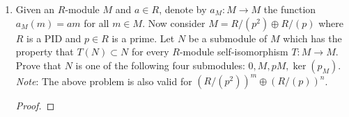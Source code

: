 \documentclass[../psets.tex]{subfiles}
\begin{document}
\begin{enumerate}
\begin{enumerate}
\begin{equation*}
            (1,0),(X,0),\dots,(X^{e-1},0),(0,1),(0,X),\dots,(0,X^{d-1})
        \end{equation*}
        is the basis for $F[X]_{<e}\oplus F[X]_{<d}$ and
        \begin{equation*}
            1,X,\dots,X^{d+e-1}
        \end{equation*}
        is the basis for $F[X]_{<d+e}$.\par
        Deduce that $\gcd(f,g)=1$ iff $\Ress(f,g)\neq 0$.
        \begin{proof}

            Suppose first that $\gcd(f,g)=1$. Then by part (i), every $h\in F[X]$ with $\deg(h)<d+e$ can be expressed as $af+bg$ for some $a,b\in F[X]$ satisfying $\deg(a)<e$ and $\deg(b)<d$. It follows that $T$ is surjective. Thus, since its domain and range have the same dimension, it is invertible as well. Therefore, it is nonsingular and hence $\Ress(f,g)\neq 0$.\par
            Now suppose that $\Ress(f,g)\neq 0$. Then $T$ is nonsingular and hence it is invertible. Thus, for the same reason as above, $T$ is surjective. In particular, 1 is in the range of $T$, so there must exist $a,b\in F[X]$ such that $af+bg=T(a,b)=1$. It follows that $1=af+bg\in(f,g)$. Therefore, $\gcd(f,g)=1$.
        \end{proof}
    \end{enumerate}
    \item Given an $R$-module $M$ and $a\in R$, denote by $a_M:M\to M$ the function $a_M(m)=am$ for all $m\in M$. Now consider $M=R/(p^2)\oplus R/(p)$ where $R$ is a PID and $p\in R$ is a prime. Let $N$ be a submodule of $M$ which has the property that $T(N)\subset N$ for every $R$-module self-isomorphism $T:M\to M$. Prove that $N$ is one of the following four submodules: $0,M,pM,\ker(p_M)$. \emph{Note}: The above problem is also valid for $(R/(p^2))^m\oplus(R/(p))^n$.
    \begin{proof}
        





\end{proof}
\end{enumerate}
\end{document}
